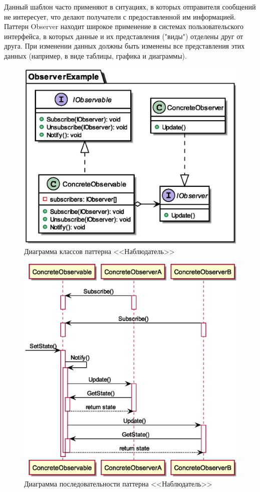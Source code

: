 \documentclass[PI,LAB]{HSEUniversity}
\begin{document}
Данный шаблон часто применяют в ситуациях, в которых отправителя сообщений не интересует, что делают получатели с предоставленной им информацией.
Паттерн Observer находит широкое применение в системах пользовательского интерфейса, в которых данные и их представления ("виды") отделены друг от друга. При изменении данных должны быть изменены все представления этих данных (например, в виде таблицы, графика и диаграммы).


\begin{figure}[h]
  \centering
  \includegraphics[scale=0.7]{Observer_CD.eps}
  \caption{Диаграмма классов паттерна <<Наблюдатель>>}
\end{figure}

\begin{figure}[h]
  \centering
  \includegraphics[scale=0.5]{Observer_SD.eps}
  \caption{Диаграмма последовательности паттерна <<Наблюдатель>>}
\end{figure}
\clearpage
\end{document}
